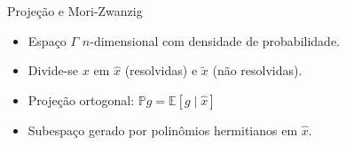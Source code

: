 
\begin{frame}{Projeção e Mori-Zwanzig}
	\begin{itemize}
		\item Espaço $\Gamma$ $n$-dimensional com densidade de probabilidade.
		\item Divide-se $x$ em $\hat{x}$ (resolvidas) e $\tilde{x}$ (não resolvidas).
		\item Projeção ortogonal: $\mathbb{P}g = \mathbb{E}[g \mid \hat{x}]$
		\item Subespaço gerado por polinômios hermitianos em $\hat{x}$.
	\end{itemize}
\end{frame}